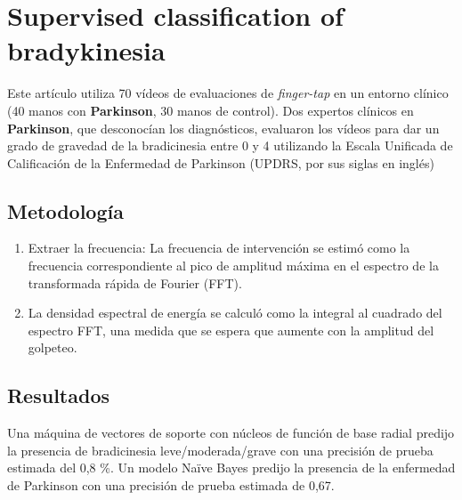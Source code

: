 \section{Supervised classification of bradykinesia}
Este artículo  \cite{williams2020supervised} utiliza 70 vídeos de evaluaciones de \textit{finger-tap} en un entorno clínico (40 manos con \textbf{Parkinson}, 30 manos de control).
Dos expertos clínicos en \textbf{Parkinson}, que desconocían los diagnósticos, evaluaron los vídeos para dar un grado de gravedad de la bradicinesia entre 0 y 4 utilizando la Escala Unificada de Calificación de la Enfermedad de Parkinson (UPDRS, por sus siglas en inglés)


\subsection{Metodología}
\begin{enumerate}
	\item Extraer la frecuencia: La frecuencia de intervención se estimó como la frecuencia correspondiente al pico de amplitud máxima en el espectro de la transformada rápida de Fourier (FFT). 
	\item La densidad espectral de energía se calculó como la integral al cuadrado del espectro FFT, una medida que se espera que aumente con la amplitud del golpeteo.
\end{enumerate}
\subsection{Resultados}
Una máquina de vectores de soporte con núcleos de función de base radial predijo la presencia de bradicinesia leve/moderada/grave con una precisión de prueba estimada del 0,8 \%.
Un modelo Naïve Bayes predijo la presencia de la enfermedad de Parkinson con una precisión de prueba estimada de 0,67. 

